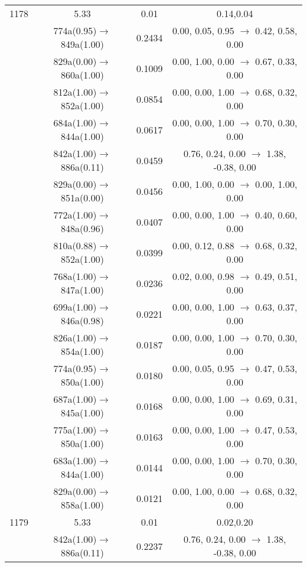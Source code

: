 \documentclass[10pt,a4paper]{article}
\begin{document}
\begin{longtable}{c|c|c|c}
 \hline1178 &	 5.33 &	 0.01 &	 0.14,0.04 \\ 
  	& 774a(0.95)$\rightarrow$849a(1.00) &	 0.2434 &	 0.00, 0.05, 0.95 $\rightarrow$ 0.42, 0.58, 0.00 \\ 
 	& 829a(0.00)$\rightarrow$860a(1.00) &	 0.1009 &	 0.00, 1.00, 0.00 $\rightarrow$ 0.67, 0.33, 0.00 \\ 
 	& 812a(1.00)$\rightarrow$852a(1.00) &	 0.0854 &	 0.00, 0.00, 1.00 $\rightarrow$ 0.68, 0.32, 0.00 \\ 
 	& 684a(1.00)$\rightarrow$844a(1.00) &	 0.0617 &	 0.00, 0.00, 1.00 $\rightarrow$ 0.70, 0.30, 0.00 \\ 
 	& 842a(1.00)$\rightarrow$886a(0.11) &	 0.0459 &	 0.76, 0.24, 0.00 $\rightarrow$ 1.38, -0.38, 0.00 \\ 
 	& 829a(0.00)$\rightarrow$851a(0.00) &	 0.0456 &	 0.00, 1.00, 0.00 $\rightarrow$ 0.00, 1.00, 0.00 \\ 
 	& 772a(1.00)$\rightarrow$848a(0.96) &	 0.0407 &	 0.00, 0.00, 1.00 $\rightarrow$ 0.40, 0.60, 0.00 \\ 
 	& 810a(0.88)$\rightarrow$852a(1.00) &	 0.0399 &	 0.00, 0.12, 0.88 $\rightarrow$ 0.68, 0.32, 0.00 \\ 
 	& 768a(1.00)$\rightarrow$847a(1.00) &	 0.0236 &	 0.02, 0.00, 0.98 $\rightarrow$ 0.49, 0.51, 0.00 \\ 
 	& 699a(1.00)$\rightarrow$846a(0.98) &	 0.0221 &	 0.00, 0.00, 1.00 $\rightarrow$ 0.63, 0.37, 0.00 \\ 
 	& 826a(1.00)$\rightarrow$854a(1.00) &	 0.0187 &	 0.00, 0.00, 1.00 $\rightarrow$ 0.70, 0.30, 0.00 \\ 
 	& 774a(0.95)$\rightarrow$850a(1.00) &	 0.0180 &	 0.00, 0.05, 0.95 $\rightarrow$ 0.47, 0.53, 0.00 \\ 
 	& 687a(1.00)$\rightarrow$845a(1.00) &	 0.0168 &	 0.00, 0.00, 1.00 $\rightarrow$ 0.69, 0.31, 0.00 \\ 
 	& 775a(1.00)$\rightarrow$850a(1.00) &	 0.0163 &	 0.00, 0.00, 1.00 $\rightarrow$ 0.47, 0.53, 0.00 \\ 
 	& 683a(1.00)$\rightarrow$844a(1.00) &	 0.0144 &	 0.00, 0.00, 1.00 $\rightarrow$ 0.70, 0.30, 0.00 \\ 
 	& 829a(0.00)$\rightarrow$858a(1.00) &	 0.0121 &	 0.00, 1.00, 0.00 $\rightarrow$ 0.68, 0.32, 0.00 \\ 
 \hline1179 &	 5.33 &	 0.01 &	 0.02,0.20 \\ 
  	& 842a(1.00)$\rightarrow$886a(0.11) &	 0.2237 &	 0.76, 0.24, 0.00 $\rightarrow$ 1.38, -0.38, 0.00 \\ 

\end{longtable}
\end{document}
